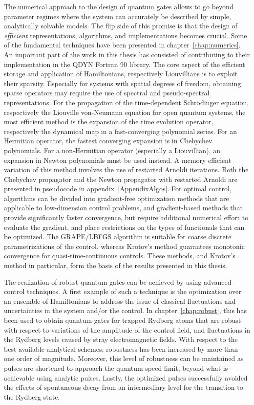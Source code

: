The numerical approach to the design of quantum gates allows to go beyond
parameter regimes where the system can accurately be described by simple,
analytically solvable models. The flip side of this promise is that the design
of \emph{efficient} representations, algorithms, and implementations becomes
crucial. Some of the fundamental techniques have been presented in
chapter~\ref{chap:numerics}.
An important part of the work in this thesis has consisted of contributing to
their implementation in the QDYN Fortran 90 library.
The core aspect of the efficient storage and
application of Hamiltonians, respectively Liouvillians is to exploit their
sparsity. Especially for systems with spatial degrees of freedom, obtaining
sparse operators may require the use of spectral and pseudo-spectral
representations. For the propagation of the time-dependent Schrödinger equation,
respectively the Liouville von-Neumann equation for open quantum systems, the
most efficient method is the expansion of the time evolution operator,
respectively the dynamical map in a fast-converging polynomial series. For an
Hermitian operator, the fastest converging expansion is in Chebychev
polynomials. For a non-Hermitian operator (especially a Liouvillian), an
expansion in Newton polynomials must be used instead. A memory efficient
variation of this method involves the use of restarted Arnoldi iterations. Both
the Chebychev propagator and the Newton propagator with restarted Arnoldi are
presented in pseudocode in appendix~\ref{AppendixAlgos}. For optimal control,
algorithms can be divided into gradient-free optimization methods that are
applicable to low-dimension control problems, and gradient-based methods that
provide significantly faster convergence, but require additional numerical
effort to evaluate the gradient, and place restrictions on the types of
functionals that can be optimized. The GRAPE/LBFGS algorithm is suitable for
coarse discrete parametrizations of the control, whereas Krotov's method
guarantees monotonic convergence for quasi-time-continuous controls.
These methods, and Krotov's method in particular, form the basis of the
results presented in this thesis.

The realization of robust quantum gates can be achieved by using advanced
control techniques. A first example of such a technique is the optimization over
an ensemble of Hamiltonians to address the issue of classical fluctuations and
uncertainties in the system and/or the control. In chapter~\ref{chap:robust},
this has been used to obtain quantum gates for trapped Rydberg atoms that are
robust with respect to  variations of the amplitude of the control field, and
fluctuations in the Rydberg levels caused by stray electromagnetic fields. With
respect to the best available analytical schemes, robustness has been increased
by more than one order of magnitude. Moreover, this level of robustness can be
maintained as pulses are shortened to approach the quantum speed limit, beyond
what is achievable using analytic pulses. Lastly, the optimized pulses
successfully avoided the effects of spontaneous decay from an intermediary level
for the transition to the Rydberg state.

